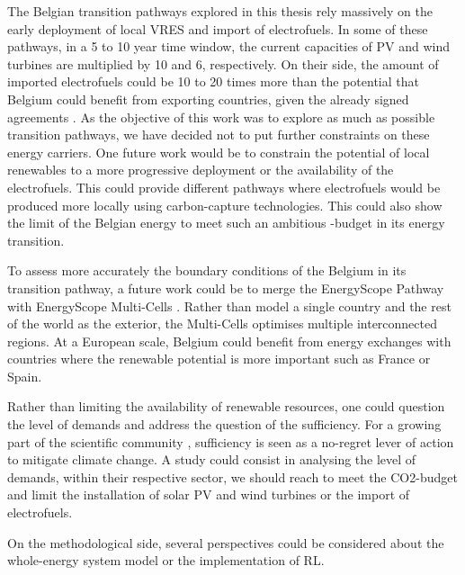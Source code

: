 The Belgian transition pathways explored in this thesis rely massively on the early deployment of local \gls{VRES} and import of electrofuels. In some of these pathways, in a 5 to 10 year time window, the current capacities of \gls{PV} and wind turbines are multiplied by 10 and 6, respectively. On their side, the amount of imported electrofuels could be 10 to 20 times more than the potential that Belgium could benefit from exporting countries, given the already signed agreements \cite{lefebvre2022electrofuel}. As the objective of this work was to explore as much as possible transition pathways, we have decided not to put further constraints on these energy carriers. One future work would be to constrain the potential of local renewables to a more progressive deployment or the availability of the electrofuels. This could provide different pathways where electrofuels would be produced more locally using carbon-capture technologies. This could also show the limit of the Belgian energy to meet such an ambitious -budget in its energy transition. 

To assess more accurately the boundary conditions of the Belgium in its transition pathway, a future work could be to merge the EnergyScope Pathway with EnergyScope Multi-Cells \cite{thiran2023validation}. Rather than model a single country and the rest of the world as the exterior, the Multi-Cells optimises multiple interconnected regions. At a European scale, Belgium could benefit from energy exchanges with countries where the renewable potential is more important such as France or Spain. 

Rather than limiting the availability of renewable resources, one could question the level of demands and address the question of the sufficiency. For a growing part of the scientific community \cite{o2018good}, sufficiency is seen as a no-regret lever of action to mitigate climate change.  A study could consist in analysing the level of demands, within their respective sector, we should reach to meet the \gls{CO2}-budget and limit the installation of solar PV and wind turbines or the import of electrofuels.

On the methodological side, several perspectives could be considered about the whole-energy system model or the implementation of \gls{RL}.

